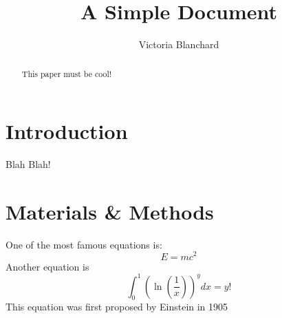 \documentclass[12pt]{article}
\title{A Simple Document}
\author{Victoria Blanchard}
\date{}
\begin{document}
    \maketitle

    \begin{abstract}
        This paper must be cool!
    \end{abstract}

    \section{Introduction}
        Blah Blah!
    \section{Materials \& Methods}
    One of the most famous equations is:
    \begin{equation}
        E = mc^2
    \end{equation}
    Another equation is 
    \begin{equation}
         \int_0^1 \left(\ln \left( \frac{1}{x} \right) 
         \right)^y dx = y!
    \end{equation}
    This equation was first proposed by Einstein in 1905
    \cite{einstein1905does}

    
    
\end{document}
